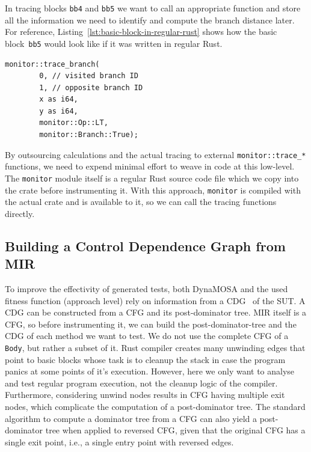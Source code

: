 \documentclass{article}
\begin{document}
In tracing blocks \lstinline{bb4} and \lstinline{bb5} we want to call an appropriate function and store all the information we need to identify and compute the branch distance later. For reference, Listing~\ref{lst:basic-block-in-regular-rust} shows how the basic block~\lstinline{bb5} would look like if it was written in regular Rust.

\begin{lstlisting}[language={}, style=boxed, caption={How would \lstinline{bb5} look like in regular Rust code}, label=lst:basic-block-in-regular-rust]
monitor::trace_branch(
        0, // visited branch ID
        1, // opposite branch ID
        x as i64,
        y as i64,
        monitor::Op::LT,
        monitor::Branch::True);
\end{lstlisting}

By outsourcing calculations and the actual tracing to external \lstinline{monitor::trace_*} functions, we need to expend minimal effort to weave in code at this low-level. The \lstinline{monitor} module itself is a regular Rust source code file which we copy into the crate before instrumenting it. With this approach, \lstinline{monitor} is compiled with the actual crate and is available to it, so we can call the tracing functions directly.

\subsection{Building a Control Dependence Graph from MIR}
To improve the effectivity of generated tests, both DynaMOSA and the used fitness function (approach level) rely on information from a \ac{CDG}~\cite{Ferrante1987} of the \ac{SUT}. A \ac{CDG} can be constructed from a \ac{CFG} and its post-dominator tree. \ac{MIR} itself is a \ac{CFG}, so before instrumenting it, we can build the post-dominator-tree and the \ac{CDG} of each method we want to test. We do not use the complete \ac{CFG} of a \lstinline{Body}, but rather a subset of it. Rust compiler creates many unwinding edges that point to basic blocks whose task is to cleanup the stack in case the program panics at some points of it's execution. However, here we only want to analyse and test regular program execution, not the cleanup logic of the compiler. Furthermore, considering unwind nodes results in \ac{CFG} having multiple exit nodes, which complicate the computation of a post-dominator tree. The standard algorithm to compute a dominator tree from a \ac{CFG} can also yield a post-dominator tree when applied to reversed \ac{CFG}, given that the original \ac{CFG} has a single exit point, i.e., a single entry point with reversed edges.
\end{document}
